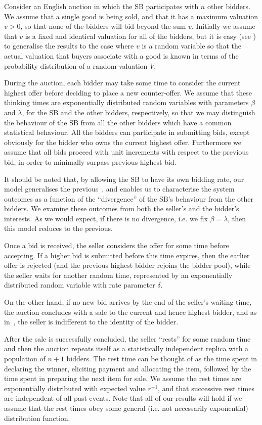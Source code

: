 \documentclass{comjnl}
\begin{document}
Consider an English auction in which the SB participates with $n$
other bidders. We assume that a single good is being sold, and
that it has a maximum valuation $v>0$, so that none of the bidders
will bid beyond the sum $v$. Initially we assume that $v$ is a
fixed and identical valuation for all of the bidders, but it is
easy (see \cite{gelenbe06}) to generalise the results to the case
where $v$ is a  random variable so that the actual valuation that
buyers associate with a good is known in terms of the probability
distribution of a random valuation $V$.

During the auction, each bidder may take some time to consider the
current highest offer before deciding to place a new
counter-offer. We assume that these thinking times are
exponentially distributed random variables with parameters $\beta$
and $\lambda$, for the SB and the other bidders, respectively, so
that we may distinguish the behaviour of the SB from all the other
bidders which have a common statistical behaviour. All the bidders
can participate in submitting bids, except obviously for the
bidder who owns the current highest offer. Furthermore we assume
that all bids proceed with unit increments with respect to the
previous bid, in order to minimally surpass previous highest bid.

It should be noted that, by allowing the SB to have its own
bidding rate, our model generalises the previous~\cite{gelenbe06},
and enables us to characterise the system outcomes as a function
of the ``divergence'' of the SB's behaviour from the other
bidders. We examine these outcomes from both the seller's and the
bidder's interests. As we would expect, if there is no divergence,
i.e. we fix $\beta=\lambda$, then this model reduces to the
previous.

Once a bid is received, the seller considers the offer for some
time before accepting. If a higher bid is submitted before this
time expires, then the earlier offer is rejected (and the previous
highest bidder rejoins the bidder pool), while the seller waits
for another random time, represented by an exponentially
distributed random variable with rate parameter $\delta$.

On the other hand, if no new bid arrives by the end of the
seller's waiting time, the auction concludes with a sale to the
current and hence highest bidder, and as in~\cite{krishna02}, the
seller is indifferent to the identity of the bidder.

After the sale is successfully concluded, the seller ``rests'' for
some random time and then the auction repeats itself as a
statistically independent replica with a population of $n+1$
bidders. The rest time can be thought of as the time spent in
declaring the winner, eliciting payment and allocating the item,
followed by the time spent in preparing the next item for sale. We
assume the rest times are exponentially distributed with expected
value $r^{-1}$, and that successive rest times are independent of
all past events. Note that all of our results will hold if we
assume that the rest times obey some general (i.e. not necessarily
exponential) distribution function.
\end{document}
